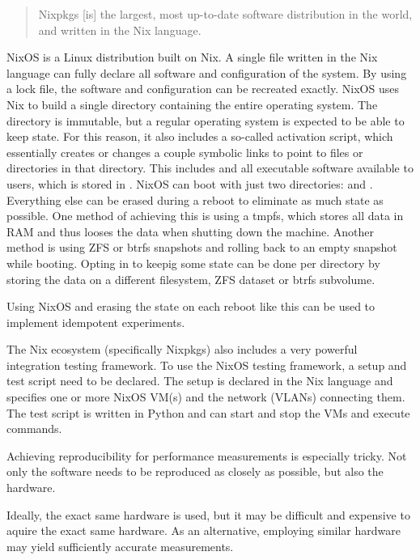 \blockquote[\cite{nixlang}]{Nixpkgs [is] the largest, most up-to-date software distribution in the world, and written in the Nix language.}

NixOS is a Linux distribution built on Nix.
A single file written in the Nix language can fully declare all software and configuration of the system.
By using a lock file, the software and configuration can be recreated exactly.
NixOS uses Nix to build a single directory containing the entire operating system.
The directory is immutable, but a regular operating system is expected to be able to keep state.
For this reason, it also includes a so-called activation script, which essentially creates or changes a couple symbolic links to point to files or directories in that directory.
This includes  and all executable software available to users, which is stored in .
NixOS can boot with just two directories:  and  \cite{Erase_your_darlings}.
Everything else can be erased during a reboot to eliminate as much state as possible.
One method of achieving this is using a tmpfs, which stores all data in RAM and thus looses the data when shutting down the machine.
Another method is using ZFS or btrfs snapshots and rolling back to an empty snapshot while booting.
Opting in to keepig some state can be done per directory by storing the data on a different filesystem, ZFS dataset or btrfs subvolume.

Using NixOS and erasing the state on each reboot like this can be used to implement idempotent experiments.

The Nix ecosystem (specifically Nixpkgs) also includes a very powerful integration testing framework.
To use the NixOS testing framework, a setup and test script need to be declared.
The setup is declared in the Nix language and specifies one or more NixOS VM(s) and the network (VLANs) connecting them.
The test script is written in Python and can start and stop the VMs and execute commands.

Achieving reproducibility for performance measurements is especially tricky.
Not only the software needs to be reproduced as closely as possible, but also the hardware.

Ideally, the exact same hardware is used, but it may be difficult and expensive to aquire the exact same hardware.
As an alternative, employing similar hardware may yield sufficiently accurate measurements.


